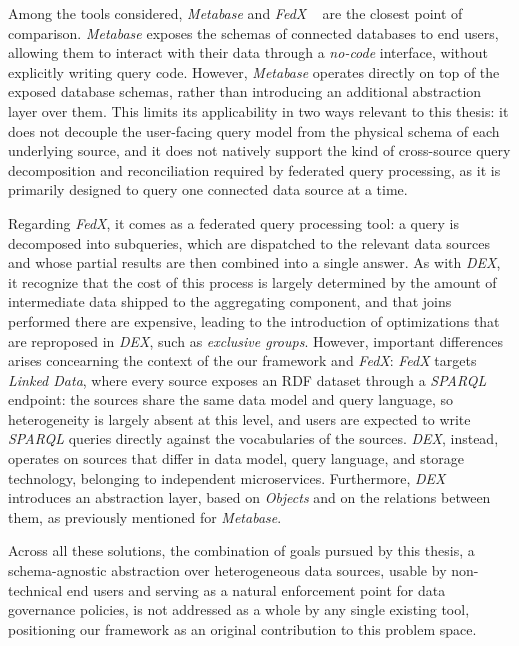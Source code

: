 Among the tools considered, \textit{Metabase} and \textit{FedX}
~\cite{schwarte2011fedx} are the closest point of comparison. 
\textit{Metabase} exposes the schemas of connected databases to end users, allowing
them to interact with their data through a \textit{no-code} interface, without
explicitly writing query code. However, \textit{Metabase} operates directly on
top of the exposed database schemas, rather than introducing an additional
abstraction layer over them. This limits its applicability in two ways relevant
to this thesis: it does not decouple the user-facing query model from the
physical schema of each underlying source, and it does not natively support the
kind of cross-source query decomposition and reconciliation required by federated
query processing, as it is primarily designed to query one connected data
source at a time.

Regarding \textit{FedX}, it comes as a federated query processing tool: a query
is decomposed into subqueries, which are dispatched to the relevant data sources
and whose partial results are then combined into a single answer. As with
\textit{DEX}, it recognize that the cost of this process is largely determined
by the amount of intermediate data shipped to the aggregating component, and
that joins performed there are expensive, leading to the introduction of
optimizations that are reproposed in \textit{DEX}, such as \textit{exclusive
groups}. However, important differences arises concearning the context of the
our framework and \textit{FedX}: \textit{FedX} targets \textit{Linked Data},
where every source exposes an RDF dataset through a \textit{SPARQL} endpoint:
the sources share the same data model and query language, so heterogeneity is
largely absent at this level, and users are expected to write \textit{SPARQL}
queries directly against the vocabularies of the sources. \textit{DEX}, instead,
operates on sources that differ in data model, query language, and storage
technology, belonging to independent microservices. Furthermore, \textit{DEX}
introduces an abstraction layer, based on \textit{Objects} and on the relations
between them, as previously mentioned for \textit{Metabase}.

Across all these solutions, the combination of goals pursued by this thesis,
a schema-agnostic abstraction over heterogeneous data sources, usable by
non-technical end users and serving as a natural enforcement point for data
governance policies, is not addressed as a whole by any single existing
tool, positioning our framework as an original contribution to this problem
space.